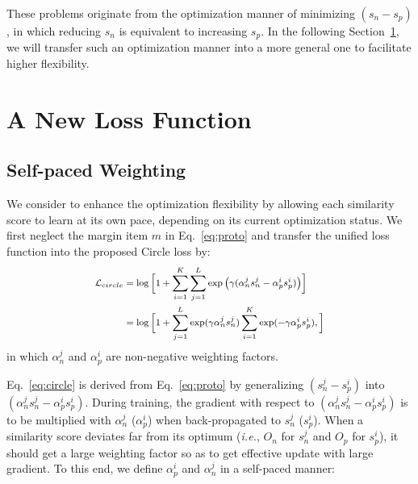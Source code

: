\documentclass[10pt,twocolumn,letterpaper]{article}
\begin{document}
These problems originate from the optimization manner of minimizing $(s_n-s_p)$, in which reducing $s_n$ is equivalent to increasing $s_p$. In the following Section~\ref{sec:circle_loss}, we will transfer such an optimization manner into a more general one to facilitate higher flexibility. 


\section{A New Loss Function} \label{sec:circle_loss}
\subsection{Self-paced Weighting}
We consider to enhance the optimization flexibility by allowing each similarity score to learn at its own pace, depending on its current optimization status. We first neglect the margin item $m$ in Eq.~\ref{eq:proto} and transfer the unified loss function into the proposed Circle loss by:
\begin{equation}\label{eq:circle}
\footnotesize{
\begin{aligned}
\mathcal{L}_{circle}&=\log\Big[1+\sum_{i=1}^K\sum_{j=1}^L\exp\big(\gamma(\alpha_n^j s_n^j - \alpha_p^i s_p^i)\big)\Big]\\
&=\log\Big[1+\sum_{j=1}^L\exp(\gamma\alpha_n^j s_n^j)\sum_{i=1}^K\exp(-\gamma\alpha_p^i s_p^i),\Big]\\
\end{aligned}
}
\end{equation} 
in which $\alpha_n^j$ and $\alpha_p^i$ are non-negative weighting factors.

Eq.~\ref{eq:circle} is derived from Eq.~\ref{eq:proto} by generalizing $(s_n^j-s_p^i)$ into $(\alpha_n^j s_n^j - \alpha_p^i s_p^i)$.
During training, the gradient with respect to $(\alpha_n^j s_n^j - \alpha_p^i s_p^i)$ is to be multiplied with $\alpha_n^j$ ($\alpha_p^i$) when back-propagated to $s_n^j$ ($s_p^i$). 
When a similarity score deviates far from its optimum (\emph{i.e.}, $O_n$ for $s_n^j$ and $O_p$ for $s_p^i$), it should get a large weighting factor so as to get effective update with large gradient.
To this end, we define $\alpha_p^i$ and $\alpha_n^j$ in a self-paced manner:
\end{document}
